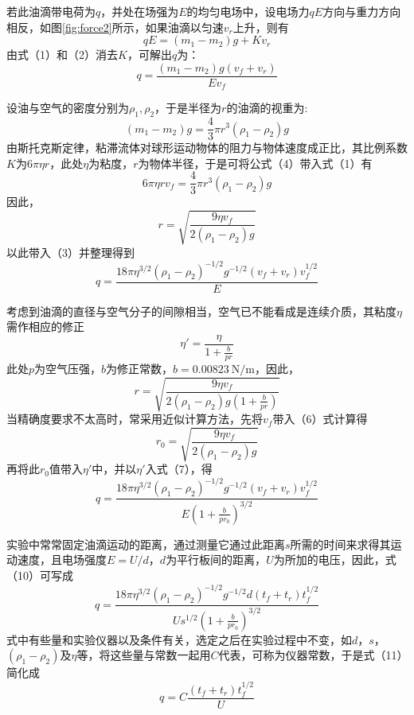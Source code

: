 \documentclass[fontset=windows,16pt]{ctexart}
\begin{document}
若此油滴带电荷为\( q \)，并处在场强为\( E \)的均匀电场中，设电场力\( qE \)方向与重力方向相反，如图\ref{fig:force2}所示，如果油滴以匀速\( v_r \)上升，则有
\[
qE = (m_1 - m_2)g + K v_r \tag{2}
\]
由式（1）和（2）消去\( K \)，可解出\( q \)为：
\[
q = \frac{(m_1 - m_2)g (v_f + v_r)}{E v_f} \tag{3}
\]

设油与空气的密度分别为\( \rho_1, \rho_2 \)，于是半径为\( r \)的油滴的视重为:
\[
(m_1 - m_2)g = \frac{4}{3}\pi r^3 (\rho_1 - \rho_2)g \tag{4}
\]
由斯托克斯定律，粘滞流体对球形运动物体的阻力与物体速度成正比，其比例系数\( K \)为\( 6\pi\eta r \)，此处\( \eta \)为粘度，\( r \)为物体半径，于是可将公式（4）带入式（1）有
\[
6\pi\eta r v_f = \frac{4}{3}\pi r^3 (\rho_1 - \rho_2)g \tag{5}
\]
因此，
\[
r = \sqrt{\frac{9\eta v_f}{2(\rho_1 - \rho_2)g}} \tag{6}
\]
以此带入（3）并整理得到
\[
q = \frac{18\pi\eta^{3/2} (\rho_1 - \rho_2)^{-1/2} g^{-1/2} (v_f + v_r) v_f^{1/2}}{E} \tag{7}
\]

考虑到油滴的直径与空气分子的间隙相当，空气已不能看成是连续介质，其粘度\( \eta \)需作相应的修正
\[
\eta' = \frac{\eta}{1 + \frac{b}{pr}}
\]
此处\( p \)为空气压强，\( b \)为修正常数，\( b = 0.00823\ \text{N/m} \)，因此，
\[
r = \sqrt{\frac{9\eta v_f}{2(\rho_1 - \rho_2)g(1 + \frac{b}{pr})}} \tag{8}
\]
当精确度要求不太高时，常采用近似计算方法，先将\( v_f \)带入（6）式计算得
\[
r_0 = \sqrt{\frac{9\eta v_f}{2(\rho_1 - \rho_2)g}} \tag{9}
\]
再将此\( r_0 \)值带入\( \eta' \)中，并以\( \eta' \)入式（7），得
\[
q = \frac{18\pi\eta^{3/2} (\rho_1 - \rho_2)^{-1/2} g^{-1/2} (v_f + v_r) v_f^{1/2}}{E \left(1 + \frac{b}{pr_0}\right)^{3/2}} \tag{10}
\]

实验中常常固定油滴运动的距离，通过测量它通过此距离\( s \)所需的时间来求得其运动速度，且电场强度\( E = U/d \)，\( d \)为平行板间的距离，\( U \)为所加的电压，因此，式（10）可写成
\[
q = \frac{18\pi\eta^{3/2} (\rho_1 - \rho_2)^{-1/2} g^{-1/2} d (t_f + t_r) t_f^{1/2}}{U s^{1/2} \left(1 + \frac{b}{pr_0}\right)^{3/2}} \tag{11}
\]
式中有些量和实验仪器以及条件有关，选定之后在实验过程中不变，如\( d \)，\( s \)，\( (\rho_1 - \rho_2) \)及\( \eta \)等，将这些量与常数一起用\( C \)代表，可称为仪器常数，于是式（11）简化成
\[
q = C \frac{(t_f + t_r) t_f^{1/2}}{U}
\]
\end{document}
